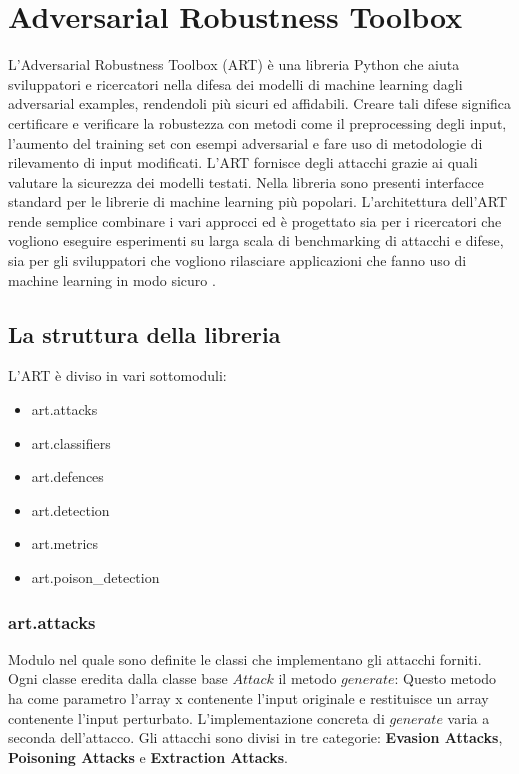 \newpage
\section{Adversarial Robustness Toolbox}
L'Adversarial Robustness Toolbox (ART) è una libreria Python che aiuta sviluppatori e ricercatori nella difesa dei modelli di machine learning dagli adversarial examples, rendendoli più sicuri 
ed affidabili. Creare tali difese significa certificare e verificare la robustezza con metodi come il preprocessing degli input,  l'aumento del training set
con esempi adversarial e fare uso di metodologie di rilevamento di input modificati. L'ART fornisce degli attacchi grazie ai quali valutare la sicurezza dei modelli
testati. Nella libreria sono presenti interfacce standard per le librerie di machine learning più popolari. L'architettura dell'ART rende semplice combinare i vari approcci  ed è progettato sia per i ricercatori che vogliono eseguire esperimenti su larga scala di benchmarking di attacchi e difese, sia per gli sviluppatori 
che vogliono rilasciare applicazioni che fanno uso di machine learning in modo sicuro \cite{art2018}.
\subsection{La struttura della libreria}
L'ART è diviso in vari sottomoduli:
\begin{itemize}
    \item art.attacks
    \item art.classifiers
    \item art.defences
    \item art.detection
    \item art.metrics
    \item art.poison\_detection
\end{itemize}

\subsubsection{art.attacks}
Modulo nel quale sono definite  le classi che implementano gli attacchi forniti. Ogni classe eredita dalla classe base  $Attack$ il metodo $generate$: Questo metodo ha come parametro l'array x contenente l'input originale e restituisce
un array contenente l'input perturbato. L'implementazione concreta di $generate$ varia a seconda dell'attacco. Gli attacchi sono divisi in tre categorie: \textbf{Evasion Attacks},
\textbf{Poisoning Attacks} e \textbf{Extraction Attacks}. 
